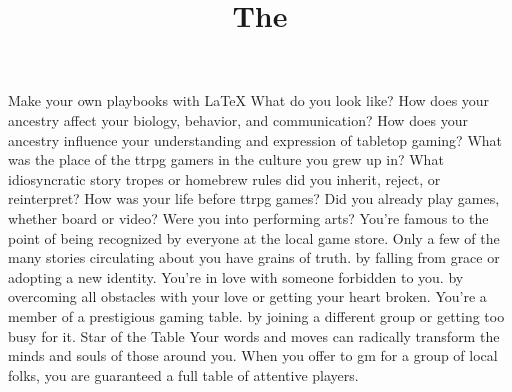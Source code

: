 \documentclass{dw2_playbook}
\title{The \playbook}
\begin{document}

\pageOne
  {
      Make your own playbooks with LaTeX
  }
  {
      What do you look like? How does your ancestry affect your biology, behavior, and communication? How does your ancestry influence your understanding and expression of tabletop gaming?
  }
  {
      What was the place of the ttrpg gamers in the culture you grew up in? What idiosyncratic story tropes or homebrew rules did you inherit, reject, or reinterpret?
  }
  {
      How was your life before ttrpg games? Did you already play games, whether board or video?  Were you into performing arts?
  }
  {
        {
          You're famous to the point of being recognized by everyone at the local game store. Only a few of the many stories circulating about you have grains of truth.  by falling from grace or adopting a new identity.
        }
        {
          You're in love with someone forbidden to you.  by overcoming all obstacles with your love or getting your heart broken.
        }
        {
          You're a member of a prestigious gaming table.  by joining a different group or getting too busy for it.
        }
      \diyDrive
  }
  {
  }
  {
      \takemove
          {
            Star of the Table
          }
          {
            Your words and moves can radically transform the minds and souls of those around you. When you offer to gm for a group of local folks, you are guaranteed a full table of attentive players.
          }
  }
  {
  }
\end{document}
